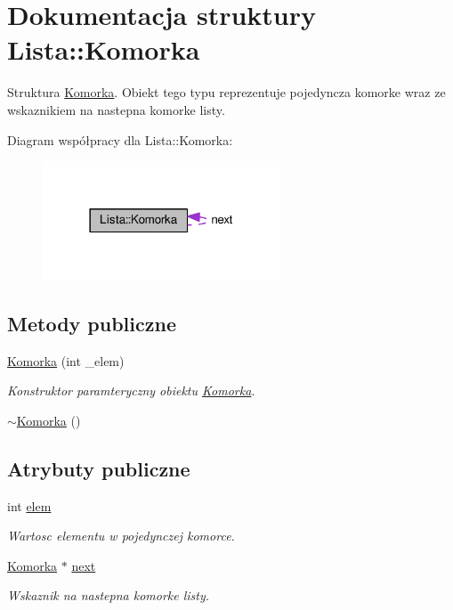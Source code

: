 \hypertarget{struct_lista_1_1_komorka}{\section{Dokumentacja struktury Lista\-:\-:Komorka}
\label{struct_lista_1_1_komorka}
}


Struktura \hyperlink{struct_lista_1_1_komorka}{Komorka}. Obiekt tego typu reprezentuje pojedyncza komorke wraz ze wskaznikiem na nastepna komorke listy.  




Diagram współpracy dla Lista\-:\-:Komorka\-:\nopagebreak
\begin{figure}[H]
\begin{center}
\leavevmode
\includegraphics[width=201pt]{struct_lista_1_1_komorka__coll__graph}
\end{center}
\end{figure}
\subsection*{Metody publiczne}
\begin{DoxyCompactItemize}
\item 
\hyperlink{struct_lista_1_1_komorka_a1843c3c4ae9752cea90cfa21076f3e9c}{Komorka} (int \-\_\-elem)
\begin{DoxyCompactList}\small\item\em Konstruktor paramteryczny obiektu \hyperlink{struct_lista_1_1_komorka}{Komorka}. \end{DoxyCompactList}\item 
\hyperlink{struct_lista_1_1_komorka_a91f3a7f9bd8ebe05fa0821e1d989c506}{$\sim$\-Komorka} ()
\end{DoxyCompactItemize}
\subsection*{Atrybuty publiczne}
\begin{DoxyCompactItemize}
\item 
int \hyperlink{struct_lista_1_1_komorka_aeb683e1dce8a8c096cc54a6645137411}{elem}
\begin{DoxyCompactList}\small\item\em Wartosc elementu w pojedynczej komorce. \end{DoxyCompactList}\item 
\hyperlink{struct_lista_1_1_komorka}{Komorka} $\ast$ \hyperlink{struct_lista_1_1_komorka_aa04e9d2ed0260f2adbff6855f7bcd77e}{next}
\begin{DoxyCompactList}\small\item\em Wskaznik na nastepna komorke listy. \end{DoxyCompactList}\end{DoxyCompactItemize}


